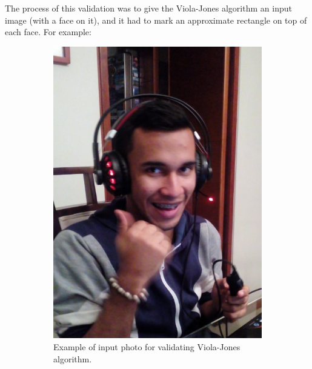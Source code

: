 \documentclass[11pt]{report} %
\begin{document}
The process of this validation was to give the Viola-Jones algorithm an input image (with a face on it), and it had to mark an approximate rectangle on top of each face. For example:

\begin{figure}[H]
	\centering
	\begin{subfigure}{.5\textwidth}
		\centering
		\includegraphics[width=0.8\linewidth]{assets/imgs/computer_vision/computer_vision_elkin.png}
		\caption{Example of input photo for validating Viola-Jones algorithm.}
		\label{fig_original_elkin}
	\end{subfigure}~
	\begin{subfigure}{.5\textwidth}
		\centering

\end{subfigure}
\end{figure}
\end{document}
